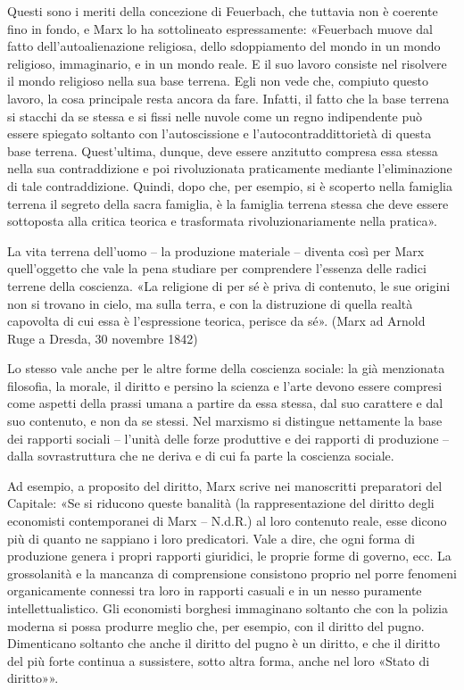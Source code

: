\documentclass[12pt,a4paper,openany]{book}
\begin{document}
Questi sono i meriti della concezione di Feuerbach, che tuttavia non è coerente fino in fondo, e Marx lo ha sottolineato espressamente: «Feuerbach muove dal fatto dell'autoalienazione religiosa, dello sdoppiamento del mondo in un mondo religioso, immaginario, e in un mondo reale. E il suo lavoro consiste nel risolvere il mondo religioso nella sua base terrena. Egli non vede che, compiuto questo lavoro, la cosa principale resta ancora da fare. Infatti, il fatto che la base terrena si stacchi da se stessa e si fissi nelle nuvole come un regno indipendente può essere spiegato soltanto con l'autoscissione e l'autocontraddittorietà di questa base terrena. Quest'ultima, dunque, deve essere anzitutto compresa essa stessa nella sua contraddizione e poi rivoluzionata praticamente mediante l'eliminazione di tale contraddizione. Quindi, dopo che, per esempio, si è scoperto nella famiglia terrena il segreto della sacra famiglia, è la famiglia terrena stessa che deve essere sottoposta alla critica teorica e trasformata rivoluzionariamente nella pratica».

La vita terrena dell'uomo – la produzione materiale – diventa così per Marx quell'oggetto che vale la pena studiare per comprendere l'essenza delle radici terrene della coscienza. «La religione di per sé è priva di contenuto, le sue origini non si trovano in cielo, ma sulla terra, e con la distruzione di quella realtà capovolta di cui essa è l'espressione teorica, perisce da sé». (Marx ad Arnold Ruge a Dresda, 30 novembre 1842)

Lo stesso vale anche per le altre forme della coscienza sociale: la già menzionata filosofia, la morale, il diritto e persino la scienza e l'arte devono essere compresi come aspetti della prassi umana a partire da essa stessa, dal suo carattere e dal suo contenuto, e non da se stessi. Nel marxismo si distingue nettamente la base dei rapporti sociali – l'unità delle forze produttive e dei rapporti di produzione – dalla sovrastruttura che ne deriva e di cui fa parte la coscienza sociale.

Ad esempio, a proposito del diritto, Marx scrive nei manoscritti preparatori del Capitale: «Se si riducono queste banalità (la rappresentazione del diritto degli economisti contemporanei di Marx – N.d.R.) al loro contenuto reale, esse dicono più di quanto ne sappiano i loro predicatori. Vale a dire, che ogni forma di produzione genera i propri rapporti giuridici, le proprie forme di governo, ecc. La grossolanità e la mancanza di comprensione consistono proprio nel porre fenomeni organicamente connessi tra loro in rapporti casuali e in un nesso puramente intellettualistico. Gli economisti borghesi immaginano soltanto che con la polizia moderna si possa produrre meglio che, per esempio, con il diritto del pugno. Dimenticano soltanto che anche il diritto del pugno è un diritto, e che il diritto del più forte continua a sussistere, sotto altra forma, anche nel loro «Stato di diritto»».
\end{document}
